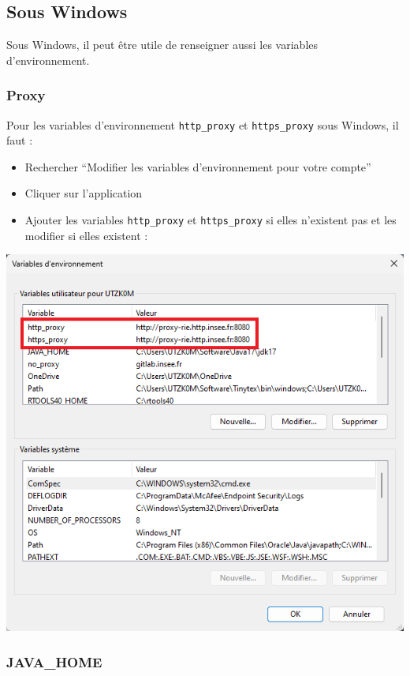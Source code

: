 \documentclass[
]{article}
\providecommand{\tightlist}{%
  \setlength{\itemsep}{0pt}\setlength{\parskip}{0pt}}
\begin{document}
\hypertarget{sous-windows}{%
\subsection{Sous Windows}\label{sous-windows}}

Sous Windows, il peut être utile de renseigner aussi les variables
d'environnement.

\hypertarget{proxy-1}{%
\subsubsection{Proxy}\label{proxy-1}}

Pour les variables d'environnement \texttt{http\_proxy} et
\texttt{https\_proxy} sous Windows, il faut :

\begin{itemize}
\tightlist
\item
  Rechercher ``Modifier les variables d'environnement pour votre
  compte''
\item
  Cliquer sur l'application
\item
  Ajouter les variables \texttt{http\_proxy} et \texttt{https\_proxy} si
  elles n'existent pas et les modifier si elles existent :
\end{itemize}

\includegraphics{../img/modify_proxy.png}

\hypertarget{java_home-1}{%
\subsubsection{JAVA\_HOME}\label{java_home-1}}
\end{document}
